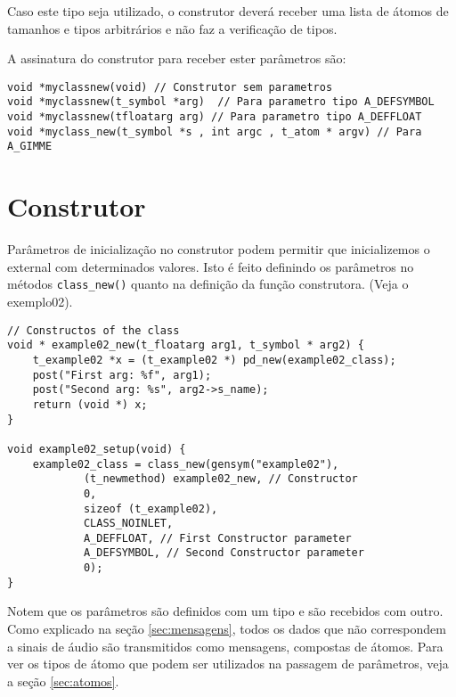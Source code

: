 Caso este tipo seja utilizado, o construtor deverá receber uma lista de átomos
de tamanhos e tipos arbitrários e não faz a verificação de tipos.

A assinatura do construtor para receber ester parâmetros são:

\begin{lstlisting}[caption=Assinatura do construtor]
void *myclassnew(void) // Construtor sem parametros
void *myclassnew(t_symbol *arg)  // Para parametro tipo A_DEFSYMBOL
void *myclassnew(tfloatarg arg) // Para parametro tipo A_DEFFLOAT
void *myclass_new(t_symbol *s , int argc , t_atom * argv) // Para A_GIMME
\end{lstlisting}

\section{Construtor}

Parâmetros de inicialização no construtor podem permitir que inicializemos o
external com determinados valores. Isto é feito definindo os parâmetros no
métodos \texttt{class\_new()} quanto na definição da função construtora. (Veja o
exemplo02).

\begin{lstlisting}[caption=Passagem de parâmetro para o construtor]
// Constructos of the class
void * example02_new(t_floatarg arg1, t_symbol * arg2) {
    t_example02 *x = (t_example02 *) pd_new(example02_class);
    post("First arg: %f", arg1);
    post("Second arg: %s", arg2->s_name);
    return (void *) x;
}

void example02_setup(void) {
    example02_class = class_new(gensym("example02"),
            (t_newmethod) example02_new, // Constructor
            0,
            sizeof (t_example02),
            CLASS_NOINLET,
            A_DEFFLOAT, // First Constructor parameter
            A_DEFSYMBOL, // Second Constructor parameter
            0);
}
\end{lstlisting}

Notem que os parâmetros são definidos com um tipo e são recebidos com outro.
Como explicado na seção \ref{sec:mensagens}, todos os dados que não
correspondem a sinais de áudio são transmitidos como mensagens, compostas de
átomos.
Para ver os tipos de átomo que podem ser utilizados na passagem de parâmetros,
veja a seção \ref{sec:atomos}.

